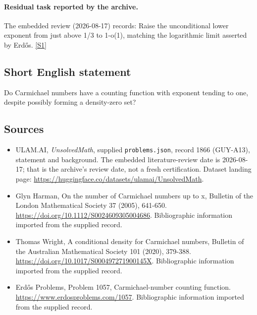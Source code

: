 \documentclass[11pt,a4paper]{article}
\newcommand{\sref}[2]{\hyperlink{source:#1:#2}{[S#2]}}
\begin{document}
\paragraph{Residual task reported by the archive.}

The embedded review (2026-08-17) records: Raise the unconditional lower exponent from just above 1/3 to 1-o(1), matching the logarithmic limit asserted by Erdős. \sref{1866}{1}

\subsection{Short English statement}

Do Carmichael numbers have a counting function with exponent tending to one, despite possibly forming a density-zero set?

\subsection{Sources}

{\small

\begin{itemize}

\item[\hypertarget{source:1866:1}{S1}] ULAM.AI, \emph{UnsolvedMath}, supplied \texttt{problems.json}, record 1866 (GUY-A13), statement and background. The embedded literature-review date is 2026-08-17; that is the archive’s review date, not a fresh certification. Dataset landing page: \url{https://huggingface.co/datasets/ulamai/UnsolvedMath}.

\item[\hypertarget{source:1866:2}{S2}] Glyn Harman, On the number of Carmichael numbers up to x, Bulletin of the London Mathematical Society 37 (2005), 641-650. \url{https://doi.org/10.1112/S0024609305004686}. Bibliographic information imported from the supplied record.

\item[\hypertarget{source:1866:3}{S3}] Thomas Wright, A conditional density for Carmichael numbers, Bulletin of the Australian Mathematical Society 101 (2020), 379-388. \url{https://doi.org/10.1017/S000497271900145X}. Bibliographic information imported from the supplied record.

\item[\hypertarget{source:1866:4}{S4}] Erdős Problems, Problem 1057, Carmichael-number counting function. \url{https://www.erdosproblems.com/1057}. Bibliographic information imported from the supplied record.

\end{itemize}

}

\label{end:1866}
\end{document}
